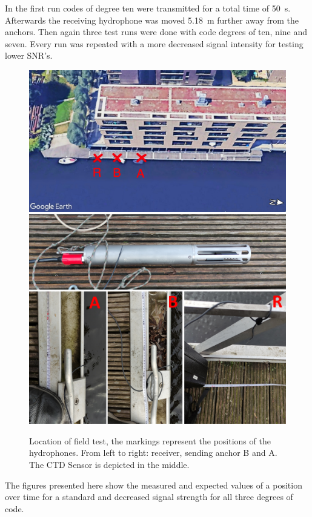 In the first run codes of degree ten were transmitted for a total time of \SI{50}{\second}. Afterwards the receiving hydrophone was moved \SI{5.18}{\meter} further away from the anchors. Then again three test runs were done with code degrees of ten, nine and seven. Every run was repeated with a more decreased signal intensity for testing lower SNR's.
\begin{figure}
	\centering
	\includegraphics[width=12cm]{images/labloc}
	\includegraphics[width=12cm]{images/measurerealcomp}
	\caption{Location of field test, the markings represent the positions of the hydrophones. From left to right: receiver, sending anchor B and A. The CTD Sensor is depicted in the middle.}
	\label{fig:simsig}
\end{figure}
The figures presented here show the measured and expected values of a position over time for a standard and decreased signal strength for all three degrees of code.

